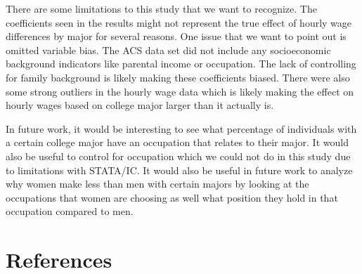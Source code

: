\documentclass[12pt]{article}
\begin{document}
\par There are some limitations to this study that we want to recognize. The coefficients seen in the results might not represent the true effect of hourly wage differences by major for several reasons. One issue that we want to point out is omitted variable bias. The ACS data set did not include any socioeconomic background indicators like parental income or occupation. The lack of controlling for family background is likely making these coefficients biased. There were also some strong outliers in the hourly wage data which is likely making the effect on hourly wages based on college major larger than it actually is.

\par In future work, it would be interesting to see what percentage of individuals with a certain college major have an occupation that relates to their major. It would also be useful to control for occupation which we could not do in this study due to limitations with STATA/IC. It would also be useful in future work to analyze why women make less than men with certain majors by looking at the occupations that women are choosing as well what position they hold in that occupation compared to men.

\section{References}
\end{document}
